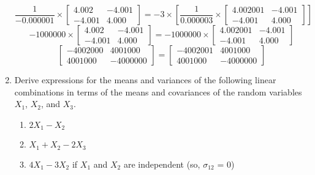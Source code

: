 \documentclass[12pt,a4paper]{paper}
\begin{document}
\begin{enumerate}
\begin{equation}
\frac{1}{-0.000001}\times\left[ \begin{array}{cc}4.002 & -4.001 \\-4.001 & 4.000\end{array} \right] = -3\times\left[\frac{1}{0.000003}\times\left[ \begin{array}{cc}4.002001 & -4.001 \\-4.001 & 4.000 \end{array} \right]\right]
\end{equation}
\begin{equation}
-1000000 \times \left[ \begin{array}{cc}4.002 & -4.001 \\-4.001 & 4.000\end{array} \right] = -1000000 \times \left[ \begin{array}{cc}4.002001 & -4.001 \\-4.001 & 4.000 \end{array} \right]
\end{equation}
\begin{equation}
\left[ \begin{array}{cc}-4002000 & 4001000 \\4001000 & -4000000\end{array} \right] = \left[ \begin{array}{cc}-4002001 & 4001000 \\4001000 & -4000000 \end{array} \right]
\end{equation}
\item Derive expressions for the means and variances of the following linear combinations in terms of the means and covariances of the random variables $X_{1}$, $X_{2}$, and $X_{3}$.
\begin{enumerate}
\item $2X_{1} - X_{2}$
\item $X_{1} +X_{2}-2X_{3}$
\item $4X_{1} - 3X_{2}$ if $X_{1}$ and $X_{2}$ are independent (so, $\sigma_{12}$ = 0)
\end{enumerate}
\end{enumerate}
\end{document}
